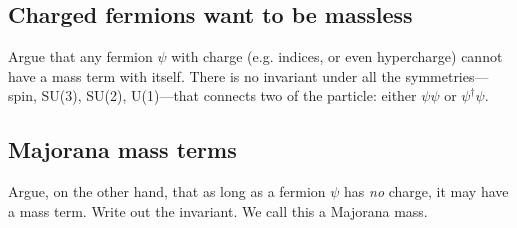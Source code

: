 \documentclass[12pt]{article}
\numberwithin{equation}{section}    %
\begin{document}
\subsection{Charged fermions want to be massless}

Argue that any fermion $\psi$ with charge (e.g. indices, or even hypercharge) cannot have a mass term with itself. There is no invariant under all the symmetries---spin, SU(3), SU(2), U(1)---that connects two of the particle: either $\psi \psi$ or $\psi^\dag\psi$.  

\subsection{Majorana mass terms}

Argue, on the other hand, that as long as a fermion $\psi$ has \emph{no} charge, it may have a mass term. Write out the invariant. We call this a Majorana mass. 







 
\end{document}
